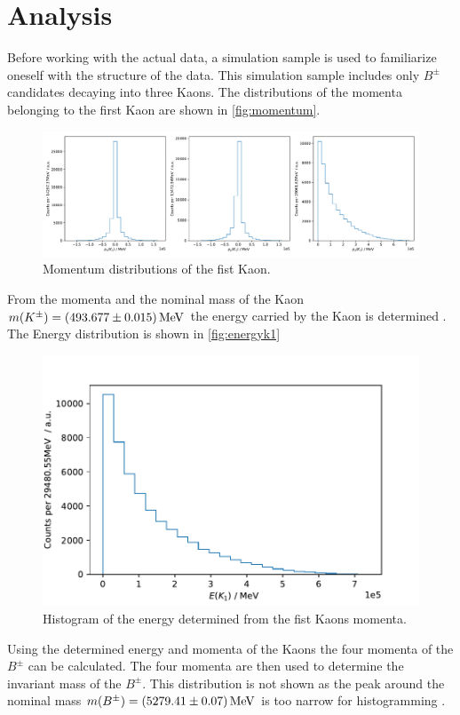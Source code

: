 \section{Analysis}  %
\label{sec:Analysis}

Before working with the actual data, 
a simulation sample is used to familiarize oneself with the structure of the data. 
This simulation sample includes only $B^\pm$ candidates decaying into three Kaons. 
The distributions of the momenta belonging to the first Kaon are shown in \autoref{fig:momentum}. 

\begin{figure}
	\centering
	\includegraphics[width=0.9\linewidth]{content/pictures/image_fin/momentum}
	\caption{Momentum distributions of the fist Kaon.}
	\label{fig:momentum}
\end{figure}


From the momenta and the nominal mass of the Kaon $m(K^\pm) = \qty{493.677 \pm 0.015}{\mega\eV }$ 
the energy carried by the Kaon is determined \cite{pdg}. 
The Energy distribution is shown in \autoref{fig:energyk1}

\begin{figure}
	\centering
	\includegraphics[width=0.6\linewidth]{content/pictures/image_fin/energyK1}
	\caption{Histogram of the energy determined from the fist Kaons momenta.}
	\label{fig:energyk1}
\end{figure}


Using the determined energy and momenta of the Kaons the four 
momenta of the $B^\pm$ can be calculated. The four momenta are then 
used to determine the invariant mass of the $B^\pm$. 
This distribution is not shown as the peak around the nominal mass 
$m(B^\pm) = \qty{5279.41\pm0.07}{\mega\eV}$ is 
too narrow for histogramming \cite{pdg}. \\



